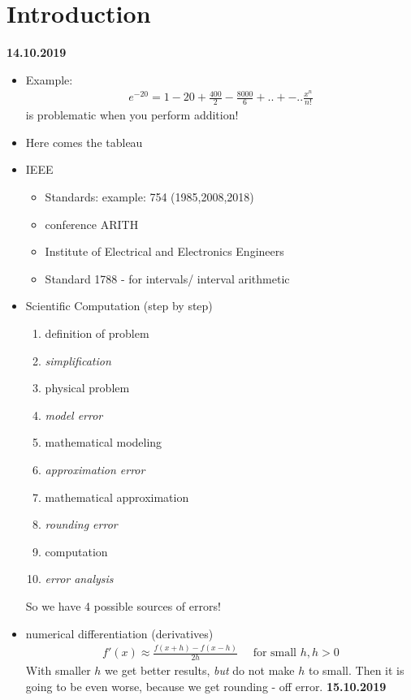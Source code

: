 \section{Introduction}
\textbf{14.10.2019}
\begin{itemize}
	\item Example:
	\begin{align*}
		e^{-20}=1-20+\frac{400}{2}-\frac{8000}{6}+..+-.. \frac{x^n}{n!}
	\end{align*}
	is problematic when you perform addition!
	\item Here comes the tableau
	\item IEEE 
	\begin{itemize}
		\item Standards: example: 754 (1985,2008,2018)
		\item conference ARITH
		\item Institute of Electrical and Electronics Engineers
		\item Standard 1788 - for intervals/ interval arithmetic
	\end{itemize}
	\item Scientific Computation (step by step) %
	\begin{enumerate}
		\item definition of problem
		\item \emph{simplification}
		\item physical problem
		\item \emph{model error}
		\item mathematical modeling
		\item \emph{approximation error}
		\item mathematical approximation
		\item \emph{rounding error}
		\item computation
		\item \emph{error analysis}
	\end{enumerate}
	So we have 4 possible sources of errors!
	\item numerical differentiation (derivatives)
	\begin{align*}
		f'(x)\approx \frac{f(x+h)-f(x-h)}{2h} \quad \text{ for small $h$}, h > 0
	\end{align*}
	With smaller $h$ we get better results, \emph{but} do not make $h$ to small. Then it is going to be even worse, because we get rounding - off error.
	\bigskip
	\textbf{15.10.2019}\\

\end{itemize}
